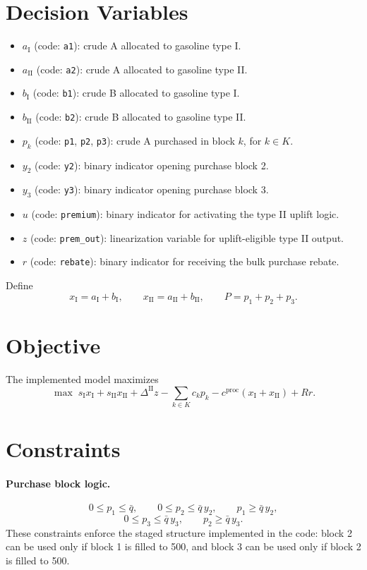 \section*{Decision Variables}

\begin{itemize}
    \item $a_{\mathrm{I}}$ (code: \texttt{a1}): crude A allocated to gasoline type I.
    \item $a_{\mathrm{II}}$ (code: \texttt{a2}): crude A allocated to gasoline type II.
    \item $b_{\mathrm{I}}$ (code: \texttt{b1}): crude B allocated to gasoline type I.
    \item $b_{\mathrm{II}}$ (code: \texttt{b2}): crude B allocated to gasoline type II.
    \item $p_k$ (code: \texttt{p1}, \texttt{p2}, \texttt{p3}): crude A purchased in block $k$, for $k\in K$.
    \item $y_2$ (code: \texttt{y2}): binary indicator opening purchase block 2.
    \item $y_3$ (code: \texttt{y3}): binary indicator opening purchase block 3.
    \item $u$ (code: \texttt{premium}): binary indicator for activating the type II uplift logic.
    \item $z$ (code: \texttt{prem\_out}): linearization variable for uplift-eligible type II output.
    \item $r$ (code: \texttt{rebate}): binary indicator for receiving the bulk purchase rebate.
\end{itemize}

Define
\[
x_{\mathrm{I}} = a_{\mathrm{I}} + b_{\mathrm{I}}, \qquad
x_{\mathrm{II}} = a_{\mathrm{II}} + b_{\mathrm{II}}, \qquad
P = p_1+p_2+p_3.
\]

\section*{Objective}

The implemented model maximizes
\[
\max \;
s_{\mathrm{I}} x_{\mathrm{I}}
+ s_{\mathrm{II}} x_{\mathrm{II}}
+ \Delta^{\mathrm{II}} z
- \sum_{k\in K} c_k p_k
- c^{\mathrm{proc}}(x_{\mathrm{I}}+x_{\mathrm{II}})
+ R r.
\]

\section*{Constraints}

\paragraph{Purchase block logic.}
\[
0 \le p_1 \le \bar q,
\qquad
0 \le p_2 \le \bar q\, y_2,
\qquad
p_1 \ge \bar q\, y_2,
\]
\[
0 \le p_3 \le \bar q\, y_3,
\qquad
p_2 \ge \bar q\, y_3.
\]
These constraints enforce the staged structure implemented in the code: block 2 can be used only if block 1 is filled to 500, and block 3 can be used only if block 2 is filled to 500.

